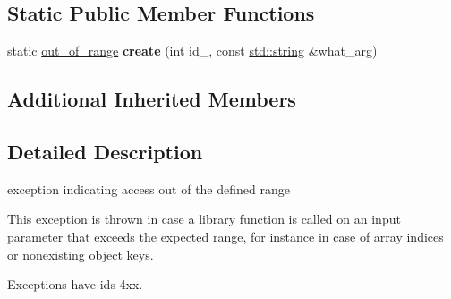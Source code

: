 \subsection*{Static Public Member Functions}
\begin{DoxyCompactItemize}
\item 
static \hyperlink{classnlohmann_1_1detail_1_1out__of__range}{out\+\_\+of\+\_\+range} {\bfseries create} (int id\+\_\+, const \hyperlink{namespacenlohmann_1_1detail_a90aa5ef615aa8305e9ea20d8a947980fab45cffe084dd3d20d928bee85e7b0f21}{std\+::string} \&what\+\_\+arg)\hypertarget{classnlohmann_1_1detail_1_1out__of__range_a3f6d82a6f967c4728a1ec735a7867073}{}\label{classnlohmann_1_1detail_1_1out__of__range_a3f6d82a6f967c4728a1ec735a7867073}

\end{DoxyCompactItemize}
\subsection*{Additional Inherited Members}


\subsection{Detailed Description}
exception indicating access out of the defined range 

This exception is thrown in case a library function is called on an input parameter that exceeds the expected range, for instance in case of array indices or nonexisting object keys.

Exceptions have ids 4xx.

